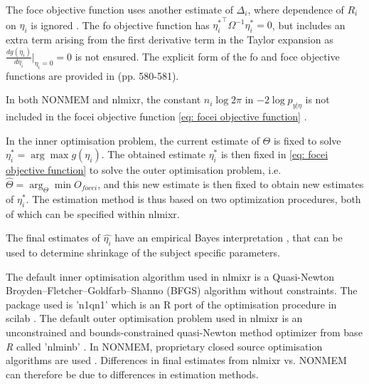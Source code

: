 The foce objective function uses another estimate of $\Delta_i$, where dependence of $R_i$ on $\eta_i$ is ignored \citep[p. 194]{Almquist2015}. The fo objective function has ${\eta_i^\ast}^\top \Omega^{-1} \eta_i^\ast=0$, but includes an extra term arising from the first derivative term in the Taylor expansion as $\frac{dg(\eta_i)}{d\eta_i}\rvert_{\eta_i=0}=0$ is not ensured. The explicit form of the fo and foce objective functions are provided in \cite{Wang2007} (pp. 580-581). 

In both NONMEM and nlmixr, the constant $n_i \log 2\pi$ in $-2\log p_{y|\eta}$ is not included in the focei objective function \eqref{eq: focei objective function} \citep[p. 581]{Wang2007, nlmixr}.

In the inner optimisation problem, the current estimate of $\Theta$ is fixed to solve $\eta_i^\ast = \arg \max g(\eta_i)$. The obtained estimate $\eta_i^\ast$ is then fixed in \eqref{eq: focei objective function} to solve the outer optimisation problem, i.e. $\hat{\Theta}=\arg_{\Theta} \min O_{focei}$, and this new estimate is then fixed to obtain new estimates of $\eta_i^\ast$. The estimation method is thus based on two optimization procedures, both of which can be specified within nlmixr.

The final estimates of $\hat{\eta_i}$ have an empirical Bayes interpretation \citep[p. 170]{Davidian1995}, that can be used to determine shrinkage of the subject specific parameters. 

The default inner optimisation algorithm used in nlmixr is a Quasi-Newton Broyden–Fletcher–Goldfarb–Shanno (BFGS) algorithm without constraints. The package used is 'n1qn1' which is an R port of the optimisation procedure in scilab \citep{n1qn1}. The default outer optimisation problem used in nlmixr is an unconstrained and bounds-constrained quasi-Newton method optimizer from base \textit{R} called 'nlminb' \citep{R-base}. In NONMEM, proprietary closed source optimisation algorithms are used \cite{githubEstimationProceeding}. Differences in final estimates from nlmixr vs. NONMEM can therefore be due to differences in estimation methods.


